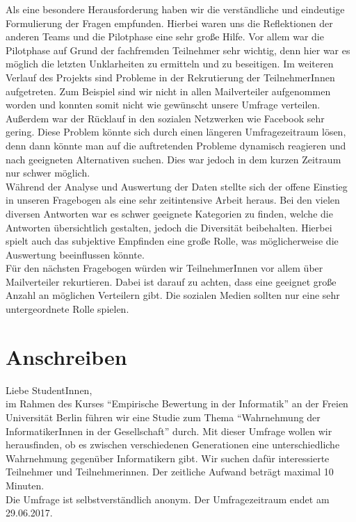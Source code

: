 \documentclass[de]{agse-empir-report}\usepackage[]{graphicx}\usepackage[]{color}
\begin{document}
Als eine besondere Herausforderung haben wir die verständliche und eindeutige Formulierung der Fragen empfunden. Hierbei waren uns die Reflektionen der anderen Teams und die Pilotphase eine sehr große Hilfe. Vor allem war die Pilotphase auf Grund der fachfremden Teilnehmer sehr wichtig, denn hier war es möglich die letzten Unklarheiten zu ermitteln und zu beseitigen. Im weiteren Verlauf des Projekts sind Probleme in der Rekrutierung der TeilnehmerInnen aufgetreten. Zum Beispiel sind wir nicht in allen Mailverteiler aufgenommen worden und konnten somit nicht wie gewünscht unsere Umfrage verteilen. Außerdem war der Rücklauf in den sozialen Netzwerken wie Facebook sehr gering. Diese Problem könnte sich durch einen längeren Umfragezeitraum lösen, denn dann könnte man auf die auftretenden Probleme dynamisch reagieren und nach geeigneten Alternativen suchen. Dies war jedoch in dem kurzen Zeitraum nur schwer möglich.\\
Während der Analyse und Auswertung der Daten stellte sich der offene Einstieg in unseren Fragebogen als eine sehr zeitintensive Arbeit heraus. Bei den vielen diversen Antworten war es schwer geeignete Kategorien zu finden, welche die Antworten übersichtlich gestalten, jedoch die Diversität beibehalten. Hierbei spielt auch das subjektive Empfinden eine große Rolle, was möglicherweise die Auswertung beeinflussen könnte.\\
Für den nächsten Fragebogen würden wir TeilnehmerInnen vor allem über Mailverteiler rekurtieren. Dabei ist darauf zu achten, dass eine geeignet große Anzahl an möglichen Verteilern gibt. Die sozialen Medien sollten nur eine sehr untergeordnete Rolle spielen.


\nocite{*}




\appendix

\section{Anschreiben}

Liebe StudentInnen,\\
im Rahmen des Kurses “Empirische Bewertung in der Informatik” an der Freien Universität Berlin führen wir eine Studie zum Thema “Wahrnehmung der InformatikerInnen in der Gesellschaft” durch. Mit dieser Umfrage wollen wir herausfinden, ob es zwischen verschiedenen Generationen eine unterschiedliche Wahrnehmung gegenüber Informatikern gibt. Wir suchen dafür interessierte Teilnehmer und Teilnehmerinnen. Der zeitliche Aufwand beträgt maximal 10 Minuten.\\
Die Umfrage ist selbstverständlich anonym. Der Umfragezeitraum endet am 29.06.2017.\\
\end{document}
